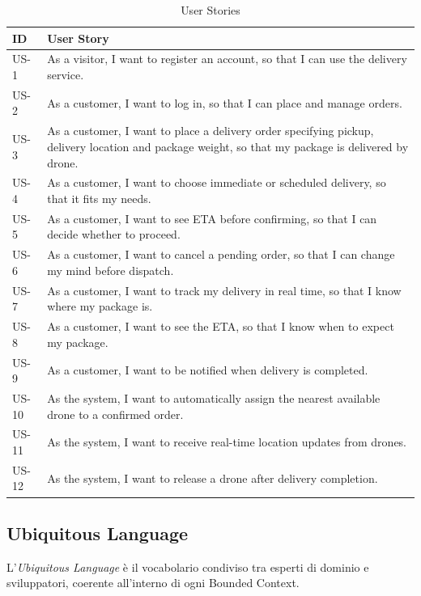 \documentclass[12pt,a4paper]{article}
\begin{document}
\begin{table}[H]
\centering
\small
\begin{tabularx}{\textwidth}{lX}
\toprule
\textbf{ID} & \textbf{User Story} \\
\midrule
US-1 & As a visitor, I want to register an account, so that I can use the delivery service. \\
US-2 & As a customer, I want to log in, so that I can place and manage orders. \\
US-3 & As a customer, I want to place a delivery order specifying pickup, delivery location and package weight, so that my package is delivered by drone. \\
US-4 & As a customer, I want to choose immediate or scheduled delivery, so that it fits my needs. \\
US-5 & As a customer, I want to see ETA before confirming, so that I can decide whether to proceed. \\
US-6 & As a customer, I want to cancel a pending order, so that I can change my mind before dispatch. \\
US-7 & As a customer, I want to track my delivery in real time, so that I know where my package is. \\
US-8 & As a customer, I want to see the ETA, so that I know when to expect my package. \\
US-9 & As a customer, I want to be notified when delivery is completed. \\
US-10 & As the system, I want to automatically assign the nearest available drone to a confirmed order. \\
US-11 & As the system, I want to receive real-time location updates from drones. \\
US-12 & As the system, I want to release a drone after delivery completion. \\
\bottomrule
\end{tabularx}
\caption{User Stories}
\end{table}

\subsection{Ubiquitous Language}

L'\textit{Ubiquitous Language} \`e il vocabolario condiviso tra esperti di dominio e sviluppatori, coerente all'interno di ogni Bounded Context.
\end{document}
